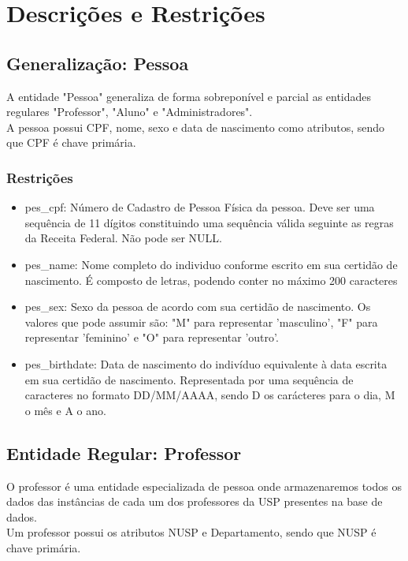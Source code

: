 \documentclass{article}
\begin{document}
  \section{Descrições e Restrições}
    \subsection{Generalização: Pessoa}
        \quad A entidade "Pessoa" generaliza de forma sobreponível e parcial as entidades regulares "Professor", "Aluno" e "Administradores". \\
        \quad A pessoa possui CPF, nome, sexo e data de nascimento como atributos, sendo que CPF é chave primária.
        \subsubsection{Restrições}
            \begin{itemize}
                \item pes\_cpf: Número de Cadastro de Pessoa Física da pessoa. Deve ser uma sequência de 11 dígitos constituindo uma sequência válida seguinte as regras da Receita Federal. Não pode ser NULL.
                \item pes\_name: Nome completo do individuo conforme escrito em sua certidão de nascimento. É composto de letras, podendo conter no máximo 200 caracteres
                \item pes\_sex: Sexo da pessoa de acordo com sua certidão de nascimento. Os valores que pode assumir são: "M" para representar 'masculino', "F" para representar 'feminino' e "O" para representar 'outro'.
                \item pes\_birthdate: Data de nascimento do indivíduo equivalente à data escrita em sua certidão de nascimento. Representada por uma sequência de caracteres no formato DD/MM/AAAA, sendo D os carácteres para o dia, M o mês e A o ano.
            \end{itemize}
            
    \subsection{Entidade Regular: Professor}
      \quad O professor é uma entidade especializada de pessoa onde armazenaremos todos os dados das instâncias de cada um dos professores da USP presentes na base de dados. \\
      \quad Um professor possui os atributos NUSP e Departamento, sendo que NUSP é chave primária.  
\end{document}
